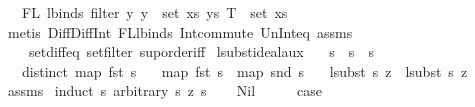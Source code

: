 \begin{isabellebody}
\ \ \ {\isachardoublequoteopen}FL\ {\isacharparenleft}{\kern0pt}lbinds\ {\isacharparenleft}{\kern0pt}filter\ {\isacharparenleft}{\kern0pt}{\isasymlambda}y{\isachardot}{\kern0pt}\ y\ {\isasymnotin}\ set\ xs{\isacharparenright}{\kern0pt}\ ys{\isacharparenright}{\kern0pt}\ T{\isacharparenright}{\kern0pt}\ {\isacharequal}{\kern0pt}\ set\ xs{\isachardoublequoteclose}\isanewline
%
\isadelimproof
%
\endisadelimproof
%
\isatagproof
{}\isamarkupfalse%
\ {\isacharparenleft}{\kern0pt}metis\ Diff{\isacharunderscore}{\kern0pt}Diff{\isacharunderscore}{\kern0pt}Int\ FL{\isacharunderscore}{\kern0pt}lbinds\ Int{\isacharunderscore}{\kern0pt}commute\ Un{\isacharunderscore}{\kern0pt}Int{\isacharunderscore}{\kern0pt}eq{\isacharparenleft}{\kern0pt}{}{\isacharparenright}{\kern0pt}\ assms{\isacharparenleft}{\kern0pt}{}{\isacharcomma}{\kern0pt}{}{\isacharparenright}{\kern0pt}\isanewline
\ \ \ \ set{\isacharunderscore}{\kern0pt}diff{\isacharunderscore}{\kern0pt}eq\ set{\isacharunderscore}{\kern0pt}filter\ sup{\isachardot}{\kern0pt}order{\isacharunderscore}{\kern0pt}iff{\isacharparenright}{\kern0pt}%
\endisatagproof
{\isafoldproof}%
%
\isadelimproof
\isanewline
%
\endisadelimproof
\isanewline
\isanewline
{}\isamarkupfalse%
\ lsubst{\isacharunderscore}{\kern0pt}ideal{\isacharunderscore}{\kern0pt}aux{\isacharcolon}{\kern0pt}\isanewline
\ \ \ {\isachardoublequoteopen}s\ {\isacharequal}{\kern0pt}\ s{}\ {\isacharat}{\kern0pt}\ s{}{\isachardoublequoteclose}\isanewline
\ \ \ {\isachardoublequoteopen}distinct\ {\isacharparenleft}{\kern0pt}map\ fst\ s{\isacharparenright}{\kern0pt}{\isachardoublequoteclose}\isanewline
\ \ \ {\isachardoublequoteopen}map\ fst\ s{}\ {\isacharequal}{\kern0pt}\ map\ snd\ s{}{\isachardoublequoteclose}\isanewline
\ \ \ {\isachardoublequoteopen}lsubst\ s\ z\ {\isacharequal}{\kern0pt}\ lsubst\ s{}\ z{\isachardoublequoteclose}\isanewline
%
\isadelimproof
%
\endisadelimproof
%
\isatagproof
{}\isamarkupfalse%
\ assms\isanewline
{}\isamarkupfalse%
\ {\isacharparenleft}{\kern0pt}induct\ s{}\ arbitrary{\isacharcolon}{\kern0pt}\ s{}\ z\ s{\isacharparenright}{\kern0pt}\isanewline
\ \ \isamarkupfalse%
\ Nil\isanewline
\ \ \isamarkupfalse%
\ \isamarkupfalse%
\ {\isacharquery}{\kern0pt}case\isanewline
\ \ \isamarkupfalse%

\end{isabellebody}

